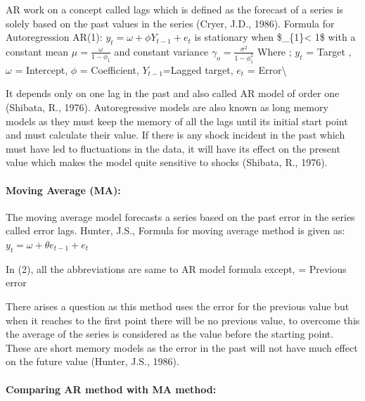 \documentclass[
  onepage,
  openany]{scrbook}
\let\oldparagraph\paragraph
\renewcommand{\paragraph}[1]{\oldparagraph{#1}\mbox{}}
\begin{document}
AR work on a concept called lags which is defined as the forecast of a
series is solely based on the past values in the series (Cryer, J.D.,
1986). Formula for Autoregression AR(1):
\(\displaystyle y_{t} = \omega + \phi Y _{t-1}+ e_{t}\) is stationary
when \$\textbar{}\phi\_\{1\}\textbar\textless{} 1\$ with a constant mean
\(\displaystyle \mu = \frac{\omega}{1-\phi_{1}}\) and constant variance
\(\displaystyle \gamma_{o} = \frac{\sigma^{2}}{1-\phi_{1}^{2}}\) Where ;
\(y_{t}\) = Target , \(\omega\) = Intercept, \(\phi\) = Coefficient,
\(Y_{t-1}\)=Lagged target, \(e_{t}\) = Error\textbackslash{}

It depends only on one lag in the past and also called AR model of order
one (Shibata, R., 1976). Autoregressive models are also known as long
memory models as they must keep the memory of all the lags until its
initial start point and must calculate their value. If there is any
shock incident in the past which must have led to fluctuations in the
data, it will have its effect on the present value which makes the model
quite sensitive to shocks (Shibata, R., 1976).

\hypertarget{moving-average-ma}{%
\paragraph{\texorpdfstring{\textbf{Moving Average
(MA):}}{Moving Average (MA):}}\label{moving-average-ma}}

The moving average model forecasts a series based on the past error in
the series called error lags. Hunter, J.S., Formula for moving average
method is given as: \(y_{t} = \omega + \theta e _{t-1}+ e_{t}\)

In (2), all the abbreviations are same to AR model formula except, =
Previous error

There arises a question as this method uses the error for the previous
value but when it reaches to the first point there will be no previous
value, to overcome this the average of the series is considered as the
value before the starting point. These are short memory models as the
error in the past will not have much effect on the future value (Hunter,
J.S., 1986).

\hypertarget{comparing-ar-method-with-ma-method}{%
\paragraph{\texorpdfstring{\textbf{Comparing AR method with MA
method:}}{Comparing AR method with MA method:}}\label{comparing-ar-method-with-ma-method}}
\end{document}

